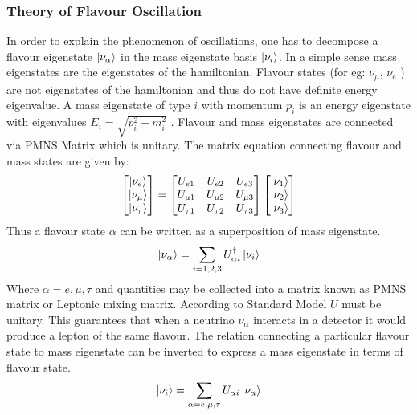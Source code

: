 \documentclass[12pt,a4paper]{report}
\begin{document}
\subsubsection{Theory of Flavour Oscillation}
In order to explain the phenomenon of oscillations, one has to decompose a flavour eigenstate $\ket{\nu_{\alpha}}$ in the mass eigenstate basis $\ket{\nu_{i}}$. In a simple sense mass eigenstates are the eigenstates of the hamiltonian. Flavour states (for eg: $\nu_{\mu}$, $\nu_{e} $ ) are not eigenstates of the hamiltonian and thus do not have definite energy eigenvalue. A mass eigenstate of type $i$ with momentum $p_{i}$ is an energy eigenstate with eigenvalues  $E_{i}=\sqrt{p_i^{2}+m_{i}^{2}}$ . Flavour and mass eigenstates are connected via PMNS Matrix which is unitary. The matrix equation connecting flavour and mass states are given by:
\begin{gather}
 \begin{bmatrix} \ket{\nu_{e}} \\ \ket{\nu_{\mu}} \\ \ket{\nu_{\tau}} \end{bmatrix} = 
 \begin{bmatrix} U_{e1} & U_{e2} & U_{e3} \\ U_{\mu 1} & U_{\mu 2} & U_{\mu 3}\\ U_{\tau 1} & U_{\tau 2} & U_{\tau 3}\end{bmatrix} \begin{bmatrix} \ket{\nu_{1}} \\ \ket{\nu_{2}} \\ \ket{\nu_{3}} \end{bmatrix}
\end{gather}
Thus a flavour state $\alpha$ can be written as a superposition of mass eigenstate.
\begin{equation}
\label{eq:0a}
	\ket{\nu_{\alpha}}=\sum_{i = 1,2,3} U^{\dagger} _{\alpha i}\ket{\nu_{i}}
\end{equation}
Where $\alpha = e,\mu,\tau$  and quantities  may be collected into a matrix known as PMNS matrix or Leptonic mixing matrix. According to Standard Model $U$ must be unitary. This guarantees that when a neutrino $\nu_{\alpha}$ interacts in a detector it would produce a lepton of the same flavour. The relation connecting a particular flavour state to mass eigenstate can be inverted to express a mass eigenstate in terms of flavour state.
\begin{equation}
\label{eq:0b}
\ket{\nu_{i}}=\sum_{\alpha = e,\mu,\tau} U_{\alpha i}\ket{\nu_{\alpha}}
\end{equation}
\end{document}
